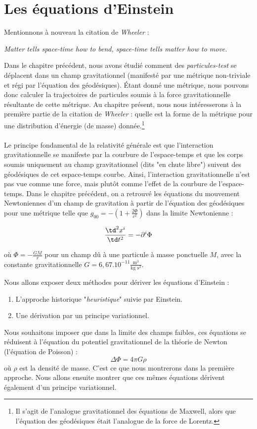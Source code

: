 \chapter{Les équations d'Einstein}
Mentionnons à nouveau la citation de \emph{Wheeler} :
\begin{center}
    \emph{Matter tells space-time how to bend, space-time tells matter how to move.}
\end{center}
Dans le chapitre précédent, nous avons étudié comment des \emph{particules-test} se déplacent dans un champ gravitationnel (manifesté par une métrique non-triviale et régi par l'équation des géodésiques). Étant donné une métrique, nous pouvons donc calculer la trajectoires de particules soumis à la force gravitationnelle résultante de cette métrique. Au chapitre présent, nous nous intéresserons à la première partie de la citation de \emph{Wheeler} : quelle est la forme de la métrique pour une distribution d'énergie (de masse) donnée.\footnote{Il s'agit de l'analogue gravitationnel des équations de Maxwell, alors que l'équation des géodésiques était l'analogue de la force de Lorentz.}\\
\\
Le principe fondamental de la relativité générale est que l'interaction gravitationnelle se manifeste par la courbure de l'espace-temps et que les corps soumis uniquement au champ gravitationnel (dits "en chute libre") suivent des géodésiques de cet espace-temps courbe. Ainsi, l’interaction gravitationnelle n'est pas vue comme une force, mais plutôt comme l'effet de la courbure de l'espace-temps. Dans le chapitre précédent, on a retrouvé les équations du mouvement Newtoniennes d'un champ de gravitation à partir de l'équation des géodésiques pour une métrique telle que $g_{00} = -\left(1 + \frac{2\Phi}{c^2}\right)$ dans la limite Newtonienne :

\begin{equation}
    \frac{\td^2x^{i}}{\td t^2} = -\partial^i \Phi
\end{equation}

où $\Phi = -\frac{GM}{r} $ pour un champ dû à une particule à masse ponctuelle $M$, avec la constante gravitationnelle $G = 6,67.10^{-11} \frac{\text{m}^3}{\text{kg} \text{ s}^2}$. 

Nous allons exposer deux méthodes pour dériver les équations d'Einstein : 
\begin{enumerate}
    \item L'approche historique "\emph{heuristique}" suivie par Einstein.
    \item Une dérivation par un principe variationnel.
\end{enumerate}
Nous souhaitons imposer que dans la limite des champs faibles, ces équations se réduisent à l'équation du potentiel gravitationnel de la théorie de Newton (l'équation de Poisson) :
\begin{equation}
    \Delta \Phi = 4\pi G\rho
    \label{eq:Poisson}
\end{equation}
où $\rho$ est la densité de masse. C'est ce que nous montrerons dans la première approche. Nous allons ensuite montrer que ces mêmes équations dérivent également d'un principe variationnel.


